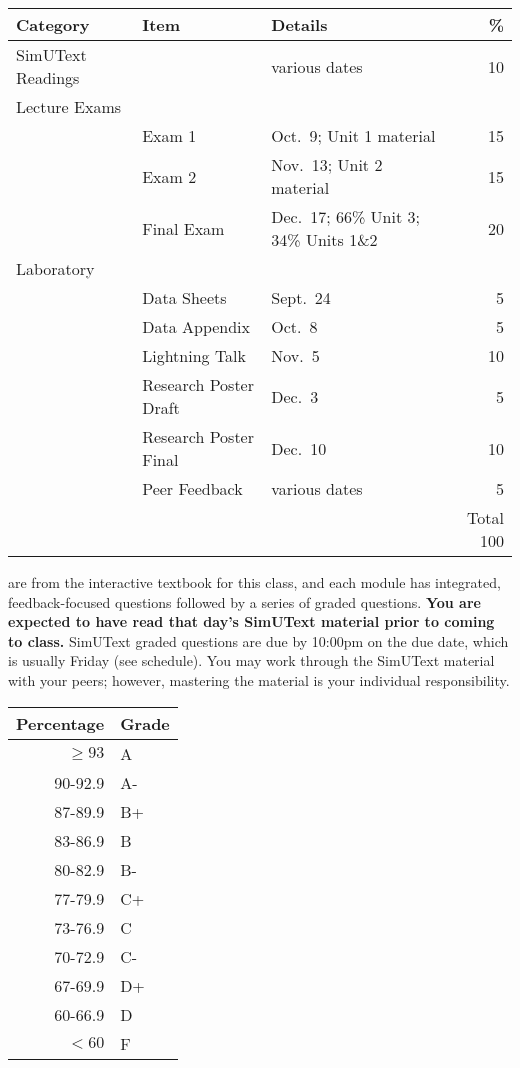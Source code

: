 \documentclass{tufte-handout}
\begin{document}

\begin{fullwidth}

\begin{table}
\begin{tabular}{l l l r}
Category & Item & Details & \% \\
\hline
SimUText Readings &  & various dates & 10\\
\hline
Lecture Exams \\
& Exam 1 & Oct.~9; Unit 1 material & 15 \\
& Exam 2 & Nov.~13; Unit 2 material & 15 \\
& Final Exam & Dec.~17; 66\% Unit 3; 34\% Units 1\&2 & 20 \\ 							%
\hline
Laboratory & &  &  \\
& Data Sheets & Sept.~24 & 5 \\
& Data Appendix & Oct.~8 & 5 \\
& Lightning Talk & Nov.~5 & 10 \\
& Research Poster Draft & Dec.~3 & 5 \\
& Research Poster Final & Dec.~10 & 10 \\
& Peer Feedback & various dates & 5 \\
\hline
& & & Total 100
\end{tabular}
\end{table}

\end{fullwidth}

\newpage

 are from the interactive textbook for this class, and each module has integrated, feedback-focused questions followed by a series of graded questions. \textbf{You are expected to have read that day's SimUText material prior to coming to class. } SimUText graded questions are due by 10:00pm on the due date, which is usually Friday (see schedule). You may work through the SimUText material with your peers; however, mastering the material is your individual responsibility.


\begin{margintable}
\begin{tabular}{rl}
Percentage & Grade \\
\hline 
$\ge93$ & A \\
90-92.9 & A- \\
87-89.9 & B+ \\
83-86.9 & B \\
80-82.9 & B- \\
77-79.9 & C+ \\
73-76.9 & C \\
70-72.9 & C- \\
67-69.9 & D+ \\
60-66.9 & D \\
$<60$ & F \\
\hline
\end{tabular}
\end{margintable}
\end{document}
